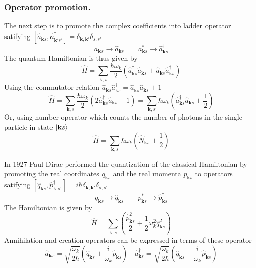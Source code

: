\documentclass[../../../main.tex]{subfiles}
\begin{document}
\subsubsection{Operator promotion.}
The next step is to promote the complex coefﬁcients into ladder operator satifying $[\hat{a}_{\mathbf{k} s}, \hat{a}_{\mathbf{k}'s'}^\dagger] = \delta_{\mathbf{k},\mathbf{k}'} \delta_{s,s'}$
\begin{equation*}
  a_{\mathbf{k} s} \rightarrow \hat{a}_{\mathbf{k}s} \qquad
  a^*_{\mathbf{k}s} \rightarrow \hat{a}^\dagger_ {\mathbf{k}s}
\end{equation*}
The quantum Hamiltonian is thus given by
\begin{equation*}
  \hat{H} = \sum_{\mathbf{k},s} \frac{\hbar \omega_{k}}{2} \left( \hat{a}_{\mathbf{k} s}^\dagger \hat{a}_{\mathbf{k} s} + \hat{a}_{\mathbf{k} s} \hat{a}_{\mathbf{k} s}^\dagger \right)
\end{equation*}
Using the commutator relation $\hat{a}_{\mathbf{k} s}\hat{a}_{\mathbf{k}s}^\dagger= \hat{a}_{\mathbf{k}s}^\dagger\hat{a}_{\mathbf{k} s} +1 $
\begin{equation*}
  \hat{H} = \sum_{\mathbf{k},s} \frac{\hbar \omega_{k}}{2} \left( 2\hat{a}_{\mathbf{k} s}^\dagger \hat{a}_{\mathbf{k} s} + 1\right)
  = \sum_{\mathbf{k},s} \hbar \omega_{k} \left( \hat{a}_{\mathbf{k} s}^\dagger \hat{a}_{\mathbf{k} s} + \frac{1 }{2}\right)
\end{equation*}
Or, using number operator which counts the number of photons in the single-particle in state $\ket{\mathbf{k }s}$
\begin{equation*}
  \hat{H}= \sum_{\mathbf{k},s} \hbar \omega_{k} \left( \hat{N}_{\mathbf{k} s} + \frac{1 }{2}\right)
\end{equation*}

In 1927 Paul Dirac performed the quantization of the classical Hamiltonian by promoting the real coordinates $q_{\mathbf{k }s}$ and the real momenta $p_{\mathbf{k }s}$ to operators satifying $[\hat{q}_{\mathbf{k} s}, \hat{p}_{\mathbf{k}'s'}^\dagger] =i \hbar  \delta_{\mathbf{k},\mathbf{k}'} \delta_{s,s'}$
\begin{equation*}
  q_{\mathbf{k} s} \rightarrow \hat{q}_{\mathbf{k}s} \qquad
  p^*_{\mathbf{k}s} \rightarrow \hat{p}^\dagger_ {\mathbf{k}s}
\end{equation*}
The Hamiltonian is given by
\begin{equation*}
  \hat{H} = \sum_{\mathbf{ k}, s}  \left( \frac{\hat{p}_{\mathbf{k}s}^{2}}{2} + \frac{1}{2} \omega_{k}^{2} \hat{q}_{\mathbf{k} s}^{2} \right)
\end{equation*}
Annihilation and creation operators can be expressed in terms of these operator
\begin{equation*}
  \hat{a}_{\mathbf{k } s} = \sqrt{\frac{\omega_k}{2\hbar}} \left( \hat{q}_{\mathbf{k } s} + \frac{i}{\omega_k} \hat{p}_{\mathbf{k } s} \right) \quad
  \hat{a}_{\mathbf{k } s} ^\dagger= \sqrt{\frac{\omega_k}{2\hbar}} \left( \hat{q}_{\mathbf{k } s} - \frac{i}{\omega_k} \hat{p}_{\mathbf{k } s} \right)
\end{equation*}
\end{document}
